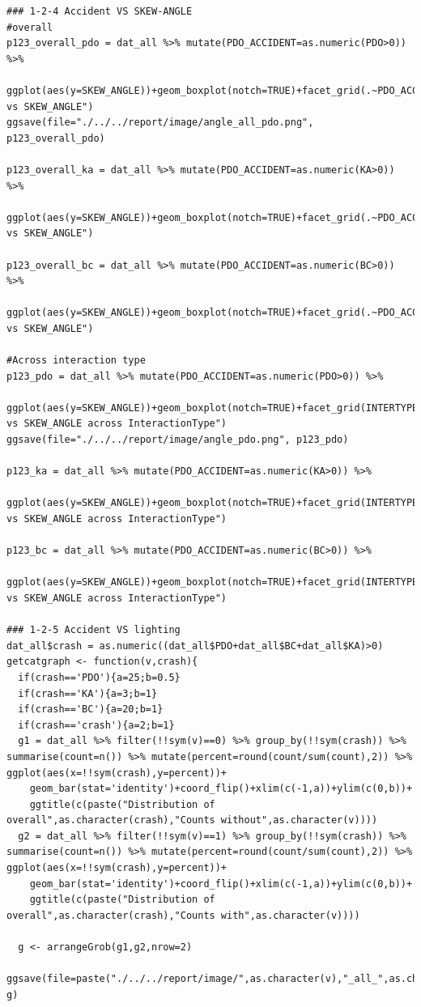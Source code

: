 \documentclass[11pt]{scrartcl} %
\begin{document}
\begin{lstlisting}
### 1-2-4 Accident VS SKEW-ANGLE
#overall
p123_overall_pdo = dat_all %>% mutate(PDO_ACCIDENT=as.numeric(PDO>0)) %>%
  ggplot(aes(y=SKEW_ANGLE))+geom_boxplot(notch=TRUE)+facet_grid(.~PDO_ACCIDENT)+ggtitle("PDO vs SKEW_ANGLE")
ggsave(file="./../../report/image/angle_all_pdo.png", p123_overall_pdo)

p123_overall_ka = dat_all %>% mutate(PDO_ACCIDENT=as.numeric(KA>0)) %>%
  ggplot(aes(y=SKEW_ANGLE))+geom_boxplot(notch=TRUE)+facet_grid(.~PDO_ACCIDENT)+ggtitle("KA vs SKEW_ANGLE")

p123_overall_bc = dat_all %>% mutate(PDO_ACCIDENT=as.numeric(BC>0)) %>%
  ggplot(aes(y=SKEW_ANGLE))+geom_boxplot(notch=TRUE)+facet_grid(.~PDO_ACCIDENT)+ggtitle("BC vs SKEW_ANGLE")

#Across interaction type
p123_pdo = dat_all %>% mutate(PDO_ACCIDENT=as.numeric(PDO>0)) %>%
  ggplot(aes(y=SKEW_ANGLE))+geom_boxplot(notch=TRUE)+facet_grid(INTERTYPE~PDO_ACCIDENT)+ggtitle("PDO vs SKEW_ANGLE across InteractionType")
ggsave(file="./../../report/image/angle_pdo.png", p123_pdo)

p123_ka = dat_all %>% mutate(PDO_ACCIDENT=as.numeric(KA>0)) %>%
  ggplot(aes(y=SKEW_ANGLE))+geom_boxplot(notch=TRUE)+facet_grid(INTERTYPE~PDO_ACCIDENT)+ggtitle("KA vs SKEW_ANGLE across InteractionType")

p123_bc = dat_all %>% mutate(PDO_ACCIDENT=as.numeric(BC>0)) %>%
  ggplot(aes(y=SKEW_ANGLE))+geom_boxplot(notch=TRUE)+facet_grid(INTERTYPE~PDO_ACCIDENT)+ggtitle("BC vs SKEW_ANGLE across InteractionType")

### 1-2-5 Accident VS lighting
dat_all$crash = as.numeric((dat_all$PDO+dat_all$BC+dat_all$KA)>0)
getcatgraph <- function(v,crash){
  if(crash=='PDO'){a=25;b=0.5}
  if(crash=='KA'){a=3;b=1}
  if(crash=='BC'){a=20;b=1}
  if(crash=='crash'){a=2;b=1}
  g1 = dat_all %>% filter(!!sym(v)==0) %>% group_by(!!sym(crash)) %>% summarise(count=n()) %>% mutate(percent=round(count/sum(count),2)) %>% ggplot(aes(x=!!sym(crash),y=percent))+
    geom_bar(stat='identity')+coord_flip()+xlim(c(-1,a))+ylim(c(0,b))+
    ggtitle(c(paste("Distribution of overall",as.character(crash),"Counts without",as.character(v))))
  g2 = dat_all %>% filter(!!sym(v)==1) %>% group_by(!!sym(crash)) %>% summarise(count=n()) %>% mutate(percent=round(count/sum(count),2)) %>% ggplot(aes(x=!!sym(crash),y=percent))+
    geom_bar(stat='identity')+coord_flip()+xlim(c(-1,a))+ylim(c(0,b))+
    ggtitle(c(paste("Distribution of overall",as.character(crash),"Counts with",as.character(v))))

  g <- arrangeGrob(g1,g2,nrow=2)
  ggsave(file=paste("./../../report/image/",as.character(v),"_all_",as.character(crash),".png",sep=""), g)



\end{lstlisting}
\end{document}
